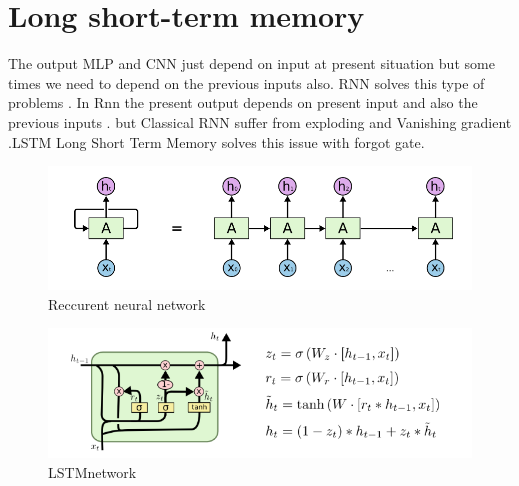 \section{Long short-term memory}
The output MLP and CNN just depend on input at present situation but some times we need to depend on the 
previous inputs also. RNN solves this type of problems . In Rnn the present output depends on present input
and also the previous inputs . but Classical RNN suffer from exploding and Vanishing gradient .LSTM Long Short Term Memory solves this issue with forgot gate. 
\begin{figure}[h]
\centering
\includegraphics[width=15cm]{Figures/rnn.png}
\caption{ Reccurent neural network}
\label{fig:rnn}
\end{figure}

\begin{figure}[h]
\centering
\includegraphics[width=15cm]{Figures/lstm.png}
\caption{ LSTMnetwork}
\label{fig:lstm}
\end{figure}

